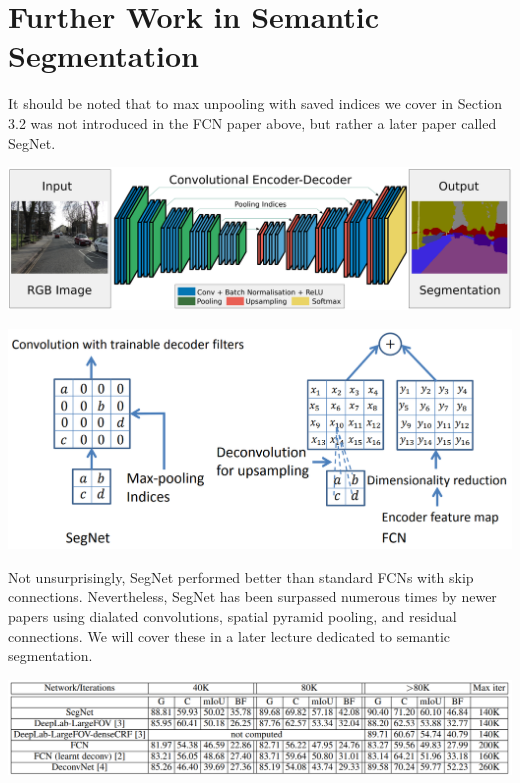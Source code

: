 \documentclass{article}
\begin{document}
\section{Further Work in Semantic Segmentation}
It should be noted that to max unpooling with saved indices we cover in Section 3.2 was not introduced in the FCN paper above, but rather a later paper called SegNet.

\begin{center}
\includegraphics[scale=0.35]{segnet.PNG}
\end{center}

\begin{center}
\includegraphics[scale=0.5]{segnetvsfcn.PNG}
\end{center}

Not unsurprisingly, SegNet performed better than standard FCNs with skip connections. Nevertheless, SegNet has been surpassed numerous times by newer papers using dialated convolutions, spatial pyramid pooling, and residual connections. We will cover these in a later lecture dedicated to semantic segmentation.

\begin{center}
\includegraphics[scale=0.54]{segnetresults.PNG}
\end{center}
\end{document}

